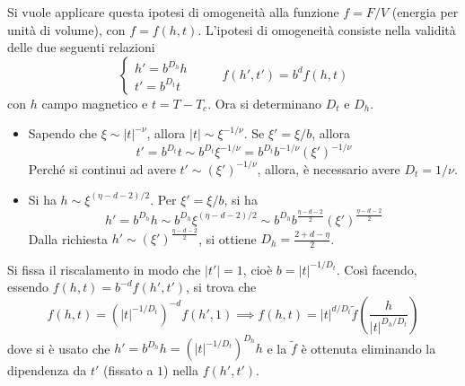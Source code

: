 \documentclass[11pt, a4paper]{scrartcl}
\theoremstyle{style}
\theoremstyle{style1}
\numberwithin{equation}{subsection}
\begin{document}
Si vuole applicare questa ipotesi di omogeneit\`a alla funzione $f = F / V$ (energia per unit\`a di volume), con $f = f(h,t)$.
L'ipotesi di omogeneit\`a consiste nella validit\`a delle due seguenti relazioni
\[
\begin{cases}
	h' = b ^{D_h}h \\
	t' = b ^{D_t}t 
\end{cases} \hspace{1cm} f(h',t') = b^d f(h,t)
\] 
con $h$ campo magnetico e $t = T- T_c$.
Ora si determinano $D_t$ e $D_h$.
\begin{itemize}
	\item Sapendo che $\xi \sim\lvert t \rvert ^{-\nu }$, allora $\lvert t \rvert \sim \xi ^{-1 / \nu }$. 
		Se $\xi ' = \xi  / b$, allora
		\[
		t ' = b^{D_t} t \sim b^{D_t} \xi ^{- 1 / \nu } = b ^{D_t} b^{- 1 / \nu } \left(\xi '\right) ^{-1 / \nu }
		\] 
	Perch\'e si continui ad avere $t' \sim \left(\xi '\right) ^{- 1 / \nu }$, allora, \`e necessario avere $D_t = 1 / \nu $.
\item Si ha $h \sim\xi ^{(\eta - d - 2 ) / 2}$. Per $\xi ' = \xi  / b$, si ha
	\[
	h ' = b ^{D_h}h \sim b ^{D_h}\xi ^{(\eta - d - 2 ) / 2} \sim b^{D_h}b ^{\frac{\eta - d - 2}{2}} \left(\xi '\right) ^{\frac{\eta - d - 2}{2}}
	\] 
	Dalla richiesta $h'\sim (\xi ')^{\frac{\eta - d - 2}{2}}$, si ottiene $D_h = \frac{2 + d - \eta }{2}$.
\end{itemize}
Si fissa il riscalamento in modo che $\lvert t' \rvert =1$, cio\`e $b = \lvert t \rvert ^{-1 / D_t}$.
Cos\`i facendo, essendo $f(h,t) = b^{-d}f(h',t')$, si trova che
\[
f(h,t) = \left(\lvert t \rvert ^{-1 / D_t}\right) ^{-d} f(h',1) \implies f(h,t) = \lvert t \rvert ^{d / D_t} \tilde{f} \left(\frac{h}{\lvert t \rvert ^{D_h / D_t}}\right) 
\] 
dove si \`e usato che $h ' = b^{D_h}h = \left(\lvert t \rvert ^{-1 / D_t}\right) ^{D_h}h$ e la $\tilde{f}$ \`e ottenuta eliminando la dipendenza da $t'$ (fissato a $1$) nella $f(h',t')$.
\end{document}

